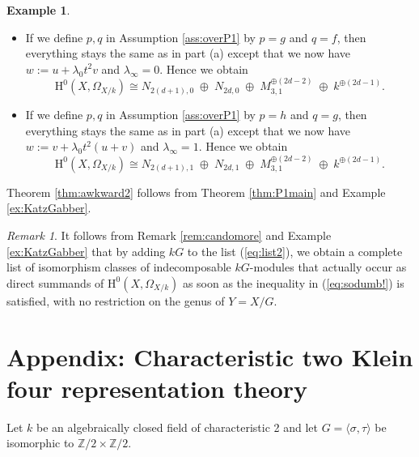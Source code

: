 \documentclass{amsart}
\numberwithin{equation}{section}
\numberwithin{table}{section}
\theoremstyle{plain}
\theoremstyle{definition}
\newtheorem{example}[theorem]{Example}
\theoremstyle{remark}
\newtheorem{remark}[theorem]{Remark}
\newcommand{\HH}{\mathrm{H}}
\begin{document}
\begin{example}
\begin{itemize}
\begin{itemize}
\item[(b)] If we define $p,q$ in Assumption \ref{ass:overP1} by $p=g$ and $q=f$, then everything stays the same as in part (a) except that we now have $w:=u+\lambda_0 t^2v$ and $\lambda_{\infty}=0$. Hence we obtain
$$\HH^0(X,\Omega_{X/k})\cong  N_{2(d+1),0} \;\oplus\; N_{2d,0} \;\oplus\; M_{3,1}^{\oplus (2d-2)} \;\oplus\; k^{\oplus (2d-1)}.$$

\item[(c)] If we define $p,q$ in Assumption \ref{ass:overP1} by $p=h$ and $q=g$, then everything stays the same as in part (a) except that we now have $w:=v + \lambda_0 t^2(u+v)$ and $\lambda_{\infty}=1$. Hence we obtain
$$\HH^0(X,\Omega_{X/k})\cong  N_{2(d+1),1} \;\oplus\; N_{2d,1} \;\oplus\; M_{3,1}^{\oplus (2d-2)} \;\oplus\; k^{\oplus (2d-1)}.$$
\end{itemize}
\end{itemize}
\end{example}

Theorem \ref{thm:awkward2} follows from Theorem \ref{thm:P1main} and Example \ref{ex:KatzGabber}.

\begin{remark}
\label{rem:sodumber!}
It follows from Remark \ref{rem:candomore} and Example \ref{ex:KatzGabber} that by adding $kG$ to the list (\ref{eq:list2}), we obtain a complete list of isomorphism classes of indecomposable $kG$-modules that actually occur as direct summands of $\HH^0(X,\Omega_{X/k})$ as soon as the inequality in (\ref{eq:sodumb!}) is satisfied, with no restriction on the genus of $Y=X/G$.
\end{remark}



\section{Appendix: Characteristic two Klein four representation theory}
\label{s:klein4rep}

Let $k$ be an algebraically closed field of characteristic 2 and let $G=\langle \sigma,\tau\rangle$ be isomorphic to $\mathbb{Z}/2\times \mathbb{Z}/2$. 
\end{document}
